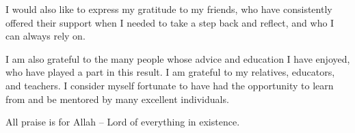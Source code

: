 I would also like to express my gratitude to my friends, who have consistently offered their support when I needed to take a step back and reflect, and who I can always rely on.

I am also grateful to the many people whose advice and education I have enjoyed, who have played a part in this result. 
I am grateful to my relatives, educators, and teachers.
I consider myself fortunate to have had the opportunity to learn from and be mentored by many excellent individuals.

All praise is for Allah -- Lord of everything in existence.  

 


\afterpage{\null\thispagestyle{empty}\newpage}
